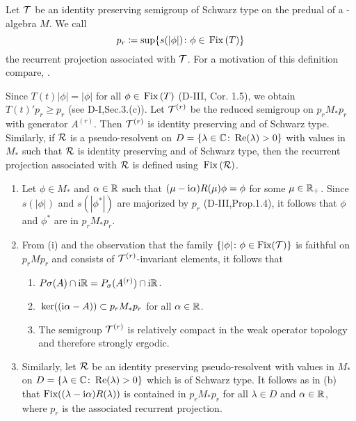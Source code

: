Let $\mathcal{T}$ be an identity preserving semigroup of Schwarz type on the predual of a \WA-algebra $M$.
We call
\[
p_{r} \coloneqq \sup\{s(|\phi|) \colon \phi \in \mathop{}\mathrm{Fix}\left(T\right)\}
\]
the recurrent projection associated with $\mathcal{T}$.
For a motivation of this definition compare, \eg \citet[Section 6.3]{davies:1976}.

Since $T(t)|\phi| = |\phi|$ for all $\phi \in \mathop{}\mathrm{Fix}\left(T\right)$ (D-III, Cor. 1.5), we obtain $T(t)'p_{r} \geq p_{r}$ (see D-I,Sec.3.(c)).
Let $\mathcal{T}^{(r)}$ be the reduced semigroup on $p_{r}M_{*}p_{r}$ with generator $A^{(r)}$.
Then $\mathcal{T}^{(r)}$ is identity preserving and of Schwarz type.
Similarly, if $\mathcal{R}$ is a pseudo-resolvent on $D = \{\lambda \in \mathbb{C} \colon \mathop{}\!\mathrm{Re}(\lambda) > 0\}$ with values in $M_{*}$ such that $\mathcal{R}$ is identity preserving and of Schwarz type, then the recurrent projection associated with $\mathcal{R}$ is defined using $\mathop{}\mathrm{Fix}\left(\mathcal{R}\right)$.
\begin{remark}\label{rem:d4-3.2}
\begin{enumerate}

\item\label{item:d4-3.2-i}
Let $\phi \in M_{*}$ and $\alpha \in \mathbb{R}$ such that $(\mu - \mathrm{i}\alpha)R(\mu)\phi = \phi$ for some $\mu \in \mathbb{R}_{+}$.
Since $s(|\phi|)$ and $s(|\phi^{*}|)$ are majorized by $p_{r}$ (D-III,Prop.1.4), it follows that $\phi$ and $\phi^{*}$ are in $p_{r}M_{*}p_{r}$.

\item\label{item:d4-3.2-ii}
From (i) and the observation that the family $\{|\phi| \colon \phi \in \text{Fix}(\mathcal{T})\}$ is
faithful on $p_{r}Mp_{r}$ and consists of $\mathcal{T}^{(r)}$-invariant elements, it follows that
\begin{enumerate}[--]
\item
$P\sigma(A) \cap \mathrm{i}\mathbb{R} = P_{\sigma}(A^{(r)}) \cap \mathrm{i}\mathbb{R}$.

\item
$\mathop{}\mathrm{ker}((\mathrm{i}\alpha - A)) \subset p_{r}M_{*}p_{r}$ for all $\alpha \in \mathbb{R}$.

\item
The semigroup $\mathcal{T}^{(r)}$ is relatively compact in the weak operator topology and therefore strongly ergodic.
\end{enumerate}


\item\label{item:d4-3.2-iii}
Similarly, let $\mathcal{R}$ be an identity preserving pseudo-resolvent with values in $M_{*}$ on $D = \{\lambda \in \mathbb{C} \colon \mathop{}\!\mathrm{Re}(\lambda) > 0\}$ which is of Schwarz type.
It follows as in (b) that $\text{Fix}((\lambda - \mathrm{i}\alpha)R(\lambda))$ is contained in $p_{r}M_{*}p_{r}$ for all $\lambda \in D$ and $\alpha \in \mathbb{R}$, where $p_{r}$ is the associated recurrent projection.
\end{enumerate}
\end{remark}
